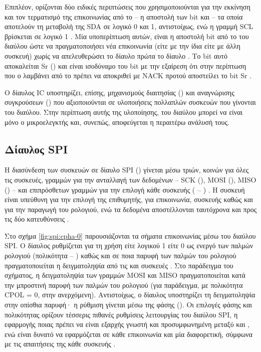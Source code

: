 Επιπλέον, ορίζονται δύο ειδικές περιπτώσεις που χρησιμοποιούνται για την
εκκίνηση και τον τερματισμό της επικοινωνίας από το  -- η αποστολή
των bit  και  -- τα οποία αποτελούν τη μεταβολή της SDA σε
λογικό 0 και 1, αντιστοίχως, ενώ η γραμμή SCL βρίσκεται σε λογικό 1
\parencite[9]{nxp14}. Μία υποπερίπτωση αυτών, είναι η αποστολή bit 
από το  του διαύλου ώστε να πραγματοποιήσει νέα επικοινωνία (είτε με
την ίδια είτε με άλλη συσκευή) χωρίς να απελευθερώσει το δίαυλο πρώτα το δίαυλο
\parencite[13]{nxp14}. Το bit αυτό αποκαλείται Sr () και
είναι ισοδύναμο του bit  με την εξαίρεση ότι στην περίπτωση που ο
 λαμβάνει από το  πρέπει να αποκριθεί με NACK προτού
αποστείλει το bit Sr \parencite[13--14]{nxp14}.

Ο δίαυλος IC υποστηρίζει, επίσης, μηχανισμούς διαιτησίας
() και αναγνώρισης συγκρούσεων () που
αξιοποιούνται σε υλοποιήσεις πολλαπλών συσκευών που γίνονται  του
διαύλου. Στην περίπτωση αυτής της υλοποίησης,  του διαύλου μπορεί να
είναι μόνο ο μικροελεγκτής και, συνεπώς, αποφεύγεται η περαιτέρω ανάλυσή τους.

\subsection{Δίαυλος SPI}
\label{subsec:spi}

Η διασύνδεση των συσκευών σε δίαυλο SPI ()
γίνεται μέσω τριών, κοινών για όλες τις συσκευές, γραμμών για την ανταλλαγή των
δεδομένων -- SCK (), MOSI (), MISO
() -- και επιπρόσθετων γραμμών για την επιλογή κάθε
 συσκευής ( -- )
\parencite[15,24]{motorola04}. Η  συσκευή είναι υπεύθυνη για την
επιλογή της επιθυμητής, για επικοινωνία,  συσκευής καθώς και για την
παραγωγή του ρολογιού, ενώ τα δεδομένα αποστέλλονται ταυτόχρονα και προς τις δύο
κατευθύνσεις \parencite[26--27]{motorola04}.

Στο σχήμα \ref{fig:spi:cpha-0} παρουσιάζονται τα σήματα επικοινωνίας μέσω του
διαύλου SPI. Ο δίαυλος ρυθμίζεται για τη χρήση είτε λογικού 1 είτε 0 ως ενεργό
 των παλμών ρολογιού (πολικότητα -- ) καθώς και σε ποια
παρυφή των παλμών του ρολογιού πραγματοποιείται η δειγματοληψία από τις
 και  συσκευές \parencite[27--28]{motorola04}. Στο
παράδειγμα του σχήματος, η δειγματοληψία των γραμμών MOSI και MISO
πραγματοποιείται κατά την μπροστινή παρυφή των παλμών του ρολογιού (για
παράδειγμα, με πολικότητα CPOL = 0, στην ανερχόμενη). Αντιστοίχως, ο δίαυλος
υποστηρίζει τη δειγματοληψία στην οπίσθια παρυφή· η ρύθμιση γίνεται μέσω της
φάσης (). Οι επιλογές φάσης και πολικότητας ορίζουν τέσσερις
πιθανές ρυθμίσεις λειτουργίας του διαύλου SPI, η εφαρμογής ποιας πρέπει να είναι
εξαρχής γνωστή και προσυμφωνημένη μεταξύ  και , ενώ είναι
δυνατό να εφαρμόζεται σε κάθε επικοινωνία και μία διαφορετική, σύμφωνα με τις
απαιτήσεις της κάθε συσκευής \parencites[27]{motorola04}[167]{atmel13}.

